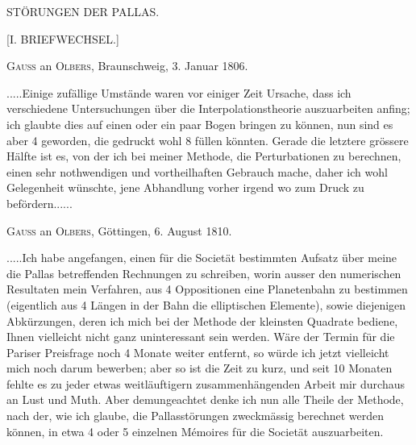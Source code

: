 \clearpage
\thispagestyle{empty}
\vspace*{1.6in}
\begin{center}{\Large STÖRUNGEN DER PALLAS.\par}\end{center}
\clearpage
{}
\begin{center}
{\large [I. BRIEFWECHSEL.]\par}
\bigskip
{}
\textsc{Gauss} an \textsc{Olbers}, Braunschweig, 3. Januar 1806.
\end{center}
\noindent\hspace*{\parindent}.\quad.\quad.\quad.\quad.\quad Einige zufällige Umstände waren vor einiger Zeit Ursache, dass ich verschiedene Untersuchungen über die Interpolationstheorie\HistoricalNoteEight{Vgl. Band III, S. 265.]} auszuarbeiten anfing; ich glaubte dies auf einen oder ein paar Bogen bringen zu können, nun sind es aber 4 geworden, die gedruckt wohl 8 füllen könnten. Gerade die letztere grössere Hälfte ist es, von der ich bei meiner Methode, die Perturbationen zu berechnen, einen sehr nothwendigen und vortheilhaften Gebrauch mache, daher ich wohl Gelegenheit wünschte, jene Abhandlung vorher irgend wo zum Druck zu befördern.\quad.\quad.\quad.\quad.\quad.
\par\bigskip
\begin{center}
\textsc{Gauss} an \textsc{Olbers}, Göttingen, 6. August 1810.
\end{center}
\noindent\hspace*{\parindent}.\quad.\quad.\quad.\quad.\quad Ich habe angefangen, einen für die Societät bestimmten Aufsatz\HistoricalNoteDouble{Vgl. Band VI, S. 1.]} über meine die Pallas betreffenden Rechnungen zu schreiben, worin ausser den numerischen Resultaten mein Verfahren, aus 4 Oppositionen eine Planetenbahn zu bestimmen (eigentlich aus 4 Längen in der Bahn die elliptischen Elemente), sowie diejenigen Abkürzungen, deren ich mich bei der Methode der kleinsten Quadrate bediene, Ihnen vielleicht nicht ganz uninteressant sein werden. Wäre der Termin für die Pariser Preisfrage noch 4 Monate weiter entfernt, so würde ich jetzt vielleicht mich noch darum bewerben; aber so ist die Zeit zu kurz, und seit 10 Monaten fehlte es zu jeder etwas weitläuftigern zusammenhängenden Arbeit mir durchaus an Lust und Muth. Aber demungeachtet denke ich nun alle Theile der Methode, nach der, wie ich glaube, die Pallasstörungen zweckmässig berechnet werden können, in etwa 4 oder 5 einzelnen Mémoires für die Societät auszuarbeiten.
